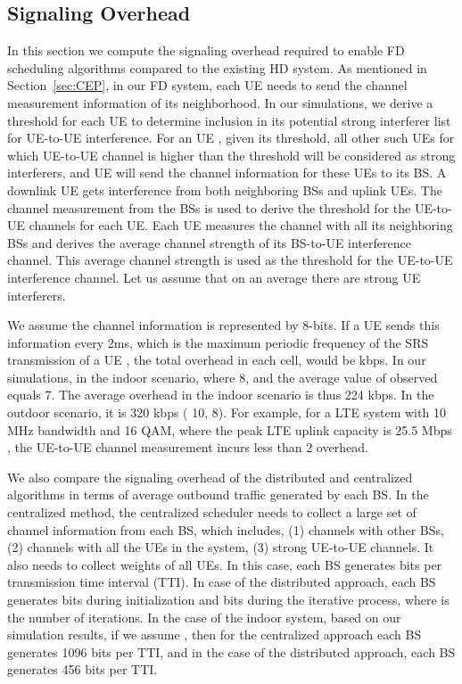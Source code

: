 \documentclass[journal]{IEEEtran}
\begin{document}
\subsection{Signaling Overhead}
In this section we compute the signaling overhead required to enable FD scheduling algorithms compared to the existing HD system. As mentioned in Section~\ref{sec:CEP}, in our FD system, each UE needs to send the channel measurement information of its neighborhood. In our simulations, we derive a threshold for each UE to determine inclusion in its potential strong interferer list for UE-to-UE interference. For an UE , given its threshold, all other such UEs for which UE-to-UE channel is higher than the threshold will be considered as strong interferers, and UE  will send the channel information for these UEs to its BS. A downlink UE gets interference from both neighboring BSs and uplink UEs. The channel measurement from the BSs is used to derive the threshold for the UE-to-UE channels for each UE. Each UE measures the channel with all its neighboring BSs and derives the average channel strength of its BS-to-UE interference channel. This average channel strength is used as the threshold for the UE-to-UE interference channel. Let us assume that on an average there are  strong UE interferers. 

We assume the channel information is represented by 8-bits. If a UE sends this information every 2ms, which is the maximum periodic frequency of the SRS transmission of a UE \cite{DahlmanLTE}, the total overhead in each cell, would be  kbps. In our simulations, in the indoor scenario, where  8, and the average value of  observed equals 7. The average overhead in the indoor scenario is thus 224 kbps. In the outdoor scenario, it is 320 kbps ( 10,  8). For example, for a LTE system with 10 MHz bandwidth and 16 QAM, where the peak LTE uplink capacity is 25.5 Mbps \cite{3GPP:5},  the UE-to-UE channel measurement incurs less than 2 overhead. 

We also compare the signaling overhead of the distributed and centralized algorithms in terms of average outbound traffic generated by each BS. In the centralized method, the centralized scheduler needs to collect a large set of channel information from each BS, which includes, (1) channels with other BSs, (2) channels with all the UEs in the system, (3) strong UE-to-UE channels. It also needs to collect weights of all UEs. In this case, each BS generates  bits per transmission time interval (TTI). In case of the distributed approach, each BS generates  bits during initialization and  bits during the iterative process, where  is the number of iterations. In the case of the indoor system, based on our simulation results, if we assume , then for the centralized approach each BS generates 1096 bits per TTI, and in the case of the distributed approach, each BS generates 456 bits per TTI.
\end{document}
